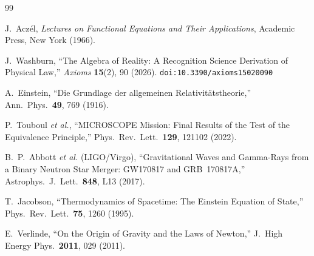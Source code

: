 \documentclass[12pt,a4paper]{article}
\theoremstyle{definition}
\theoremstyle{remark}
\begin{document}
\begin{thebibliography}{99}

J.~Acz\'el, \textit{Lectures on Functional Equations and Their
Applications}, Academic Press, New York (1966).

J.~Washburn, ``The Algebra of Reality: A Recognition Science Derivation
of Physical Law,'' \emph{Axioms} \textbf{15}(2), 90 (2026).
\texttt{doi:10.3390/axioms15020090}

A.~Einstein, ``Die Grundlage der allgemeinen
Relativit\"atstheorie,'' Ann.\ Phys.\ \textbf{49}, 769
(1916).

P.~Touboul \textit{et al.}, ``MICROSCOPE Mission: Final
Results of the Test of the Equivalence Principle,''
Phys.\ Rev.\ Lett.\ \textbf{129}, 121102 (2022).

B.~P.~Abbott \textit{et al.} (LIGO/Virgo), ``Gravitational
Waves and Gamma-Rays from a Binary Neutron Star Merger:
GW170817 and GRB~170817A,'' Astrophys.\ J.\ Lett.\
\textbf{848}, L13 (2017).

T.~Jacobson, ``Thermodynamics of Spacetime: The Einstein
Equation of State,'' Phys.\ Rev.\ Lett.\ \textbf{75},
1260 (1995).

E.~Verlinde, ``On the Origin of Gravity and the Laws of
Newton,'' J.\ High Energy Phys.\ \textbf{2011}, 029
(2011).

\end{thebibliography}
\end{document}
